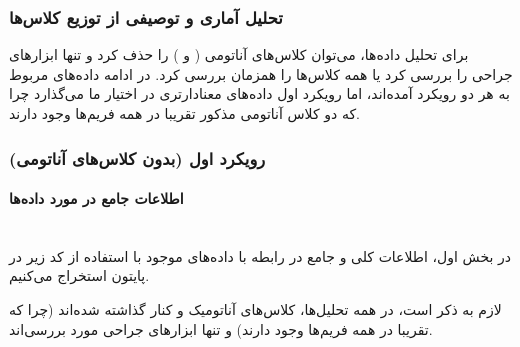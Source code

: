 \documentclass{article}
\begin{document}
\subsubsection{تحلیل آماری و توصیفی از توزیع کلاس‌ها}

برای تحلیل داده‌ها، می‌توان کلاس‌های آناتومی ( و ) را حذف کرد و تنها ابزارهای جراحی را بررسی کرد یا همه کلاس‌ها را همزمان بررسی کرد.
در ادامه داده‌های مربوط به هر دو رویکرد آمده‌اند، اما رویکرد اول داده‌های معنادارتری در اختیار ما می‌گذارد چرا که دو کلاس آناتومی مذکور تقریبا در همه فریم‌ها وجود دارند.
\subsubsection*{رویکرد اول (بدون کلاس‌های آناتومی)}
\paragraph{اطلاعات جامع در مورد داده‌ها}\mbox{}\\
در بخش اول، اطلاعات کلی و جامع در رابطه با داده‌های موجود با استفاده از کد زیر در پایتون استخراج می‌کنیم. 

لازم به ذکر است، در همه تحلیل‌ها، کلاس‌های آناتومیک  و  کنار گذاشته شده‌اند (چرا که تقریبا در همه فریم‌ها وجود دارند) و تنها ابزارهای جراحی مورد بررسی‌اند.
\end{document}
